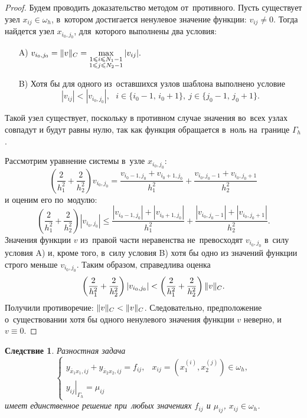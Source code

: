 \documentclass[11pt,a4paper,twoside]{report}
\numberwithin{equation}{section}
\theoremstyle{definition}
\theoremstyle{plain}
\newtheorem*{cons*}{Следствие}
\DeclarePairedDelimiter\norm{\lVert}{\rVert}
\begin{document}
\begin{proof}
    Будем проводить доказательство методом от~противного. Пусть существует
    узел $x_{ij} \in \omega_h$, в~котором достигается ненулевое значение функции:
    $
        v_{ij} \ne 0.
    $
    Тогда найдется
    узел $x_{i_0,j_0}$, для~которого выполнены два условия:
    \begin{enumerate}
        \item[A)] $v_{i_0,j_0} = \norm{v}_C=
        \max\limits_{\substack{1 \leqslant i \leqslant N_1 - 1\\
        1 \leqslant j \leqslant N_2 - 1}} |v_{ij}|.$
        \item[B)] Хотя бы для одного из~оставшихся узлов шаблона выполнено
            условие
        $$
            |v_{ij}| < |v_{i_0,j_0}|,
            ~~~i\in\{i_0-1,\,i_0+1\},~j\in\{j_0-1,\,j_0+1\}.
        $$
    \end{enumerate}

    Такой узел существует, поскольку в противном случае значения во~всех узлах
    совпадут и будут равны нулю, так как функция обращается в~ноль
    на~границе $\Gamma_h$.

    Рассмотрим уравнение системы в~узле $x_{i_0, j_0}$:
    $$
        \left(\frac{2}{h_1^2} + \frac{2}{h_2^2}\right)v_{i_0, j_0} =
        \frac{v_{i_0-1,j_0}+v_{i_0+1,j_0}}{h_1^2}+
        \frac{v_{i_0, j_0-1}+v_{i_0, j_0 + 1}}{h_2^2}
    $$
    и оценим его по~модулю:
    $$
        \left(\frac{2}{h_1^2} + \frac{2}{h_2^2}\right)|v_{i_0, j_0}| \leqslant
        \frac{|v_{i_0-1,j_0}|+|v_{i_0+1,j_0}|}{h_1^2}+
        \frac{|v_{i_0, j_0-1}|+|v_{i_0, j_0 + 1}|}{h_2^2}.
    $$
    Значения функции $v$ из~правой части неравенства не~превосходят $v_{i_0,j_0}$
    в~силу условия A) и, кроме того, в~силу условия B) хотя бы одно из значений
    функции строго меньше $v_{i_0,j_0}$. Таким образом, справедлива оценка
    $$
        \left(\frac{2}{h_1^2}+\frac{2}{h_2^2}\right)|v_{i_0,j_0}|<
        \left(\frac{2}{h_1^2}+\frac{2}{h_2^2}\right)\norm{v}_C.
    $$
    Получили противоречие: $\norm{v}_C < \norm{v}_C$. Следовательно,
    предположение о~существовании хотя бы одного ненулевого значения функции
    $v$ неверно, и $v \equiv 0$.
\end{proof}
%
%
\begin{cons*}
    Разностная задача
    $$
        \begin{cases}
            y_{\overline{x}_1x_1,ij}+y_{\overline{x}_2x_2,ij}=f_{ij}, &
                x_{ij} = \left(x_1^{(i)}, x_2^{(j)}\right) \in \omega_h,\\
            \left.y_{ij}\right\vert_{\Gamma_h} = \mu_{ij} &
        \end{cases}
    $$
    имеет единственное решение при~любых значениях $f_{ij}$ и $\mu_{ij}$,
    $x_{ij}\in\omega_h$.
\end{cons*}
\end{document}
